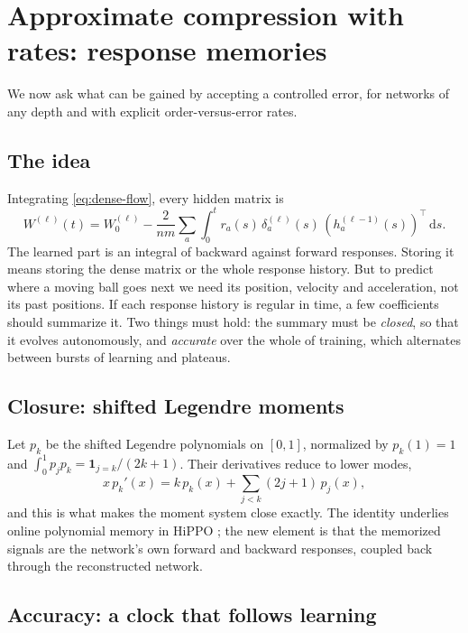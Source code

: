 \documentclass[11pt]{article}
\theoremstyle{definition}
\theoremstyle{remark}
\newcommand{\dd}{\,\mathrm{d}}
\begin{document}
\section{Approximate compression with rates: response memories}
\label{sec:memory}

We now ask what can be gained by accepting a controlled error, for networks of
any depth and with explicit order-versus-error rates.

\subsection{The idea}

Integrating \eqref{eq:dense-flow}, every hidden matrix is
\begin{equation}
 W^{(\ell)}(t)=W_0^{(\ell)}-\frac{2}{nm}\sum_a
 \int_0^t r_a(s)\,\delta_a^{(\ell)}(s)\,
 (h_a^{(\ell-1)}(s))^\top\dd s .                        \label{eq:exact-history}
\end{equation}
The learned part is an integral of backward against forward responses.  Storing
it means storing the dense matrix or the whole response history.  But to predict
where a moving ball goes next we need its position, velocity and acceleration,
not its past positions.  If each response history is regular in time, a few
coefficients should summarize it.  Two things must hold: the summary must be
\emph{closed}, so that it evolves autonomously, and \emph{accurate} over the
whole of training, which alternates between bursts of learning and plateaus.

\subsection{Closure: shifted Legendre moments}

Let $p_k$ be the shifted Legendre polynomials on $[0,1]$, normalized by
$p_k(1)=1$ and $\int_0^1p_jp_k=\mathbf 1_{j=k}/(2k+1)$.  Their derivatives reduce
to lower modes,
\begin{equation}
 x\,p_k'(x)=k\,p_k(x)+\sum_{j<k}(2j+1)\,p_j(x),        \label{eq:triangular}
\end{equation}
and this is what makes the moment system close exactly.  The identity underlies
online polynomial memory in HiPPO \citep{gu2020hippo}; the new element is that
the memorized signals are the network's own forward and backward responses,
coupled back through the reconstructed network.

\subsection{Accuracy: a clock that follows learning}
\end{document}
